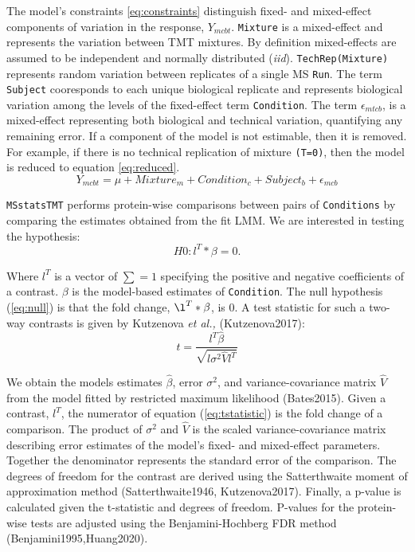 \documentclass[11pt]{elife}\usepackage[]{graphicx}\usepackage[]{color}
\begin{document}
The model's constraints \ref{eq:constraints} distinguish fixed- and mixed-effect
components of variation in the response, $Y_{mcbt}$. \texttt{Mixture} is a
mixed-effect and represents the variation between TMT mixtures. By definition
mixed-effects are assumed to be independent and normally distributed
(\textit{iid}). \texttt{TechRep(Mixture)} represents random variation between
replicates of a single MS \texttt{Run}.  The term \texttt{Subject} cooresponds
to each unique biological replicate and represents biological variation among
the levels of the fixed-effect term \texttt{Condition}. The term
$\epsilon_{mtcb}$, is a mixed-effect representing both biological and technical
variation, quantifying any remaining error. If a component of the model is not
estimable, then it is removed.  For example, if there is no technical
replication of mixture \texttt{(T=0)}, 
then the model is reduced to equation \ref{eq:reduced}.
\begin{equation} %
	\label{eq:reduced} %
	Y_{mcbt} = \mu + Mixture_m + Condition_c + Subject_b + \epsilon_{mcb}
\end{equation}

\texttt{MSstatsTMT} performs protein-wise comparisons between pairs of 
\texttt{Conditions} by comparing the estimates obtained from the fit LMM. 
We are interested in testing the hypothesis:
\begin{equation}
	\label{eq:null} %
	H0 : l^T * \beta = 0. 
\end{equation}

Where $l^T$ is a vector of $\sum=1$ specifying the positive and negative
coefficients of a contrast. $\beta$ is the model-based estimates of
\texttt{Condition}.  The null hypothesis (\ref{eq:null}) is that the fold
change, $\l^T * \beta$, is 0.  A test statistic for such a two-way contrasts is
given by Kutzenova \textit{et al.,} (Kutzenova2017):
\begin{equation} 
	\label{eq:tstatistic} %
	t = \frac{l^T \hat{\beta}}{\sqrt{l \sigma^2 \hat{V} l^T}}
\end{equation}

We obtain the models estimates $\hat{\beta}$, error $\sigma^2$, and
variance-covariance matrix $\hat{V}$ from the model fitted by restricted maximum
likelihood (Bates2015). Given a contrast, $l^T$, the numerator of equation
(\ref{eq:tstatistic}) is the fold change of a comparison.  The product of
$\sigma^2$ and $\hat{V}$ is the scaled variance-covariance matrix describing
error estimates of the model's fixed- and mixed-effect parameters.  Together the
denominator represents the standard error of the comparison. The degrees of
freedom for the contrast are derived using the Satterthwaite moment of
approximation method (Satterthwaite1946, Kutzenova2017).  Finally, a p-value is
calculated given the t-statistic and degrees of freedom.  P-values for the
protein-wise tests are adjusted using the Benjamini-Hochberg FDR method
(Benjamini1995,Huang2020).\\
\end{document}
